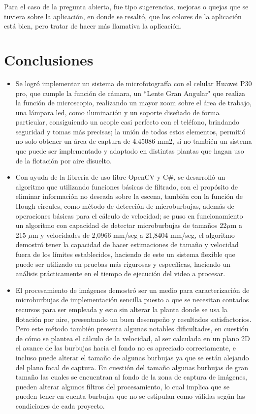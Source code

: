 \documentclass[12pt,twocolumn,a4paper]{article}
\begin{document}
Para el caso de la pregunta abierta, fue tipo sugerencias, mejoras o quejas que se tuviera sobre la aplicación, en donde se resaltó, que los colores de la aplicación está bien, pero tratar de hacer más llamativa la aplicación.

\section{Conclusiones }
\begin{itemize}
\item Se logró implementar un sistema de microfotografía con el celular Huawei P30 pro, que cumple la función de  cámara, un “Lente Gran Angular" que realiza la función de microscopio, realizando un mayor zoom sobre el área de trabajo, una lámpara led, como iluminación y un soporte diseñado de forma particular, consiguiendo un acople casi perfecto con el teléfono, brindando seguridad y tomas más precisas; la unión de todos estos elementos, permitió no solo obtener un área de captura de  4.45086 mm2, si no también un sistema que puede ser implementado y adaptado en distintas plantas que hagan uso de la flotación por aire disuelto.
\item Con ayuda de la librería de uso libre OpenCV  y C\#, se desarrolló un algoritmo que utilizando funciones básicas de filtrado, con el propósito de eliminar información no deseada sobre la escena,   también con la función de Hough circules, como método de detección de microburbujas, además de operaciones básicas para el cálculo de velocidad; se puso en funcionamiento un algoritmo con capacidad de detectar microburbujas de tamaños 22$\mu$m a 215 $\mu$m  y velocidades de 2,0966 mm/seg a  21,8404 mm/seg, el algoritmo demostró tener la capacidad de hacer estimaciones de tamaño y velocidad fuera de los límites establecidos, haciendo de este un sistema flexible que puede ser utilizado en pruebas más rigurosas y específicas, haciendo un análisis prácticamente en el tiempo de ejecución del video a procesar.
\item El procesamiento de imágenes demostró ser un medio para caracterización de microburbujas de implementación sencilla puesto a que se necesitan contados recursos para ser empleada y esto sin alterar la planta donde se usa la flotación por aire, presentando un buen desempeño y resultados satisfactorios. Pero este método también presenta algunas notables dificultades, en cuestión de cómo se plantea el cálculo de la velocidad, al ser calculada en un plano 2D el avance de las burbujas hacia el fondo no es apreciado correctamente, e incluso puede alterar el tamaño de algunas burbujas ya que se están alejando del plano focal de captura. En cuestión del tamaño algunas burbujas de gran tamaño las cuales se encuentran al fondo de la zona de captura de imágenes, pueden alterar algunos filtros del procesamiento, lo cual implica que se pueden tener en cuenta burbujas que no se estipulan como válidas según las condiciones de cada proyecto.

\end{itemize}
\end{document}
